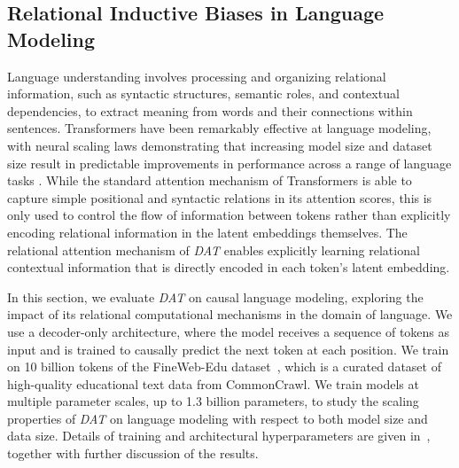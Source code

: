 
\subsection{Relational Inductive Biases in Language Modeling}\label{ssec:fineweb}


Language understanding involves processing and organizing relational information, such as syntactic structures, semantic roles, and contextual dependencies, to extract meaning from words and their connections within sentences. Transformers have been remarkably effective at language modeling, with neural scaling laws demonstrating that increasing model size and dataset size result in predictable improvements in performance across a range of language tasks \citep{kaplan2020scalinglawsneurallanguage,hoffmann2022trainingcomputeoptimallargelanguage}. While the standard attention mechanism of Transformers is able to capture simple positional and syntactic relations in its attention scores, this is only used to control the flow of information between tokens rather than explicitly encoding relational information in the latent embeddings themselves. The relational attention mechanism of \textit{DAT} enables explicitly learning relational contextual information that is directly encoded in each token's latent embedding.

In this section, we evaluate \textit{DAT} on causal language modeling, exploring the impact of its relational computational mechanisms in the domain of language. We use a decoder-only architecture, where the model receives a sequence of tokens as input and is trained to causally predict the next token at each position. We train on 10 billion tokens of the FineWeb-Edu dataset~\citep{lozhkov2024fineweb-edu}, which is a curated dataset of high-quality educational text data from CommonCrawl. We train models at multiple parameter scales, up to 1.3 billion parameters, to study the scaling properties of \textit{DAT} on language modeling with respect to both model size and data size. Details of training and architectural hyperparameters are given in~, together with further discussion of the results.


